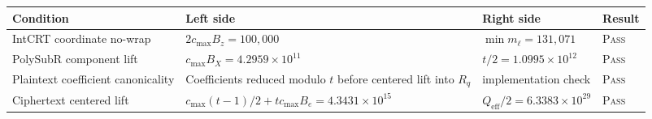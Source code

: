 \begin{tabularx}{\linewidth}{@{}L{3.8cm}L{3.0cm}L{3.0cm}L{1.0cm}@{}}
\toprule
Condition & Left side & Right side & Result \\
\midrule
IntCRT coordinate no-wrap & $2c_{\max}B_z=100{,}000$ & $\min m_\ell=131{,}071$ & \textsc{Pass} \\
PolySubR component lift & $c_{\max}B_X=4.2959\times 10^{11}$ & $t/2=1.0995\times 10^{12}$ & \textsc{Pass} \\
Plaintext coefficient canonicality & Coefficients reduced modulo $t$ before centered lift into $R_q$ & implementation check & \textsc{Pass} \\
Ciphertext centered lift & $c_{\max}(t-1)/2+tc_{\max}B_e=4.3431\times 10^{15}$ & $Q_{\mathrm{eff}}/2=6.3383\times 10^{29}$ & \textsc{Pass} \\
\bottomrule
\end{tabularx}
